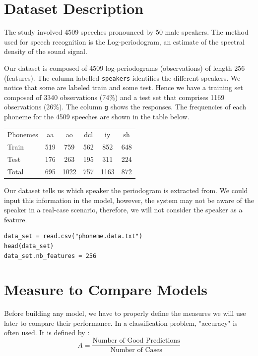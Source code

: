 \documentclass[]{report}
\begin{document}
\section{Dataset Description}

The study involved 4509 speeches pronounced by 50 male speakers. The method used for speech recognition is the Log-periodogram, an estimate of the spectral density of the sound signal.

Our dataset is composed of 4509 log-periodograms (observations) of length 256 (features). The column labelled \texttt{speakers} identifies the different speakers. We notice that some are labeled train and some test. Hence we have a training set composed of 3340 observations (74\%) and a test set that comprises 1169 observations (26\%). The column \texttt{g} shows the responses. The frequencies of each phoneme for the 4509 speeches are shown in the table below.

\begin{center}
\begin{tabular}{l c c c c c}
 Phonemes	 & aa &  ao & dcl & iy & sh \\
Train & 519 & 759 & 562 & 852 & 648\\
Test  & 176 & 263 & 195 & 311 & 224\\
Total & 695 & 1022 & 757 & 1163 & 872
\end{tabular}
\end{center}

Our dataset tells us which speaker the periodogram is extracted from. We could input this information in the model, however, the system may not be aware of the speaker in a real-case scenario, therefore, we will not consider the speaker as a feature. 

\begin{lstlisting}
data_set = read.csv("phoneme.data.txt")
head(data_set)
data_set.nb_features = 256
\end{lstlisting}

\section{Measure to Compare Models}
Before building any model, we have to properly define the measures we will use later to compare their performance. In a classification problem, "accuracy" is often used. It is defined by :
$$
	A = \frac{\text{Number of Good Predictions}}{\text{Number of Cases}}
$$
\end{document}
